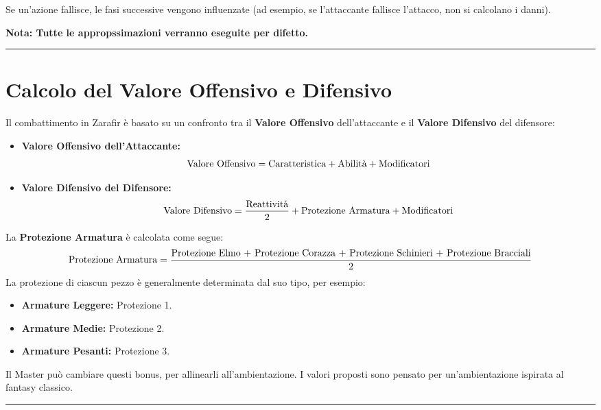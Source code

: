 \documentclass[../manuale_main.tex]{subfiles}
\begin{document}
Se un'azione fallisce, le fasi successive vengono influenzate (ad esempio, se l'attaccante fallisce l'attacco, non si calcolano i danni).

\textbf{Nota: Tutte le appropssimazioni verranno eseguite per difetto.}

\vspace{0.5cm}
\noindent
\begin{center}
\rule{\textwidth}{0.4pt} 
\end{center}
\vspace{0.5cm}

\section{Calcolo del Valore Offensivo e Difensivo}
Il combattimento in Zarafir è basato su un confronto tra il \textbf{Valore Offensivo} dell'attaccante e il \textbf{Valore Difensivo} del difensore:

\begin{itemize}
    \item \textbf{Valore Offensivo dell'Attaccante:}
    \[
    \textnormal{Valore Offensivo} = \textnormal{Caratteristica} + \textnormal{Abilità} + \textnormal{Modificatori}
    \]
    \item \textbf{Valore Difensivo del Difensore:}
    \[
    \textnormal{Valore Difensivo} = \frac{\textnormal{Reattività}}{2} + \textnormal{Protezione Armatura} + \textnormal{Modificatori}
    \]

\end{itemize}

La \textbf{Protezione Armatura} è calcolata come segue:
\[
\textnormal{Protezione Armatura} = \frac{\textnormal{Protezione Elmo + Protezione Corazza + Protezione Schinieri + Protezione Bracciali}}{2}
\]
La protezione di ciascun pezzo è generalmente determinata dal suo tipo, per esempio:
\begin{itemize}
    \item \textbf{Armature Leggere:} Protezione 1.
    \item \textbf{Armature Medie:} Protezione 2.
    \item \textbf{Armature Pesanti:} Protezione 3.
\end{itemize}
Il Master può cambiare questi bonus, per allinearli all'ambientazione. I valori proposti sono pensato per un'ambientazione ispirata al fantasy classico.

\vspace{0.5cm}
\noindent
\begin{center}
\rule{\textwidth}{0.4pt} 
\end{center}
\vspace{0.5cm}
\end{document}
